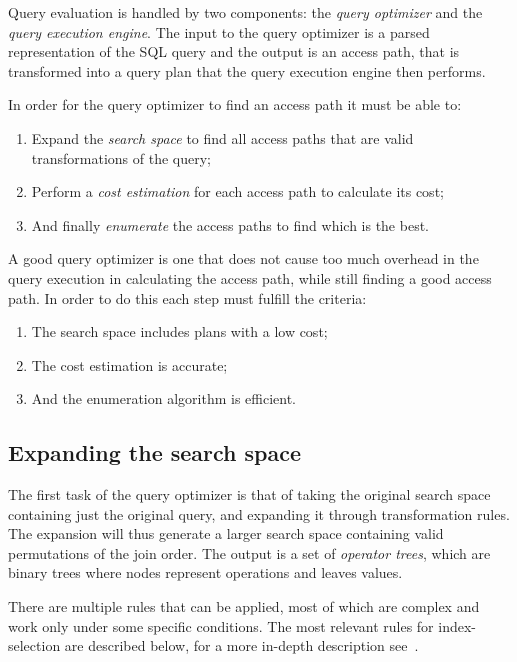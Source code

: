 Query evaluation is handled by two components: the \textit{query optimizer} and
the \textit{query execution engine}. The input to the query optimizer is a
parsed representation of the SQL query and the output is an access path, that is
transformed into a query plan that the query execution engine then performs.

In order for the query optimizer to find an access path it must be able to:
\begin{enumerate}
\item Expand the \textit{search space} to find all access paths that are valid
  transformations of the query;
\item Perform a \textit{cost estimation} for each access path to calculate its
  cost;
\item And finally \textit{enumerate} the access paths to find which is the best.
\end{enumerate}

A good query optimizer is one that does not cause too much overhead in the query
execution in calculating the access path, while still finding a good access
path. In order to do this each step must fulfill the criteria:
\begin{enumerate}
\item The search space includes plans with a low cost;
\item The cost estimation is accurate;
\item And the enumeration algorithm is efficient.
\end{enumerate}

\subsection{Expanding the search space}
The first task of the query optimizer is that of taking the original search
space containing just the original query, and expanding it through
transformation rules. The expansion will thus generate a larger search space
containing valid permutations of the join order. The output is a set of
\textit{operator trees}, which are binary trees where nodes represent operations
and leaves values.

There are multiple rules that can be applied, most of which are complex and work
only under some specific conditions. The most relevant rules for index-selection
are described below, for a more in-depth description
see~\cite{chaudhuri_1998_overview_aooqoirs}.

